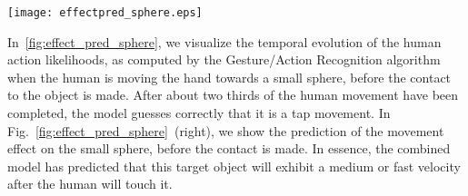 
\begin{figure*}
  \quad
  \texttt{[image: effectpred\_sphere.eps]}
  \caption{Object velocity predictions on a small sphere, given probabilistic human action information from Gesture \acp{HMM}.}
  \label{fig:effect_pred_sphere}
\end{figure*}

In~\ref{fig:effect_pred_sphere}, we visualize the temporal evolution of the human action likelihoods, as computed by the Gesture/Action Recognition algorithm when the human is moving the hand towards a small sphere, before the contact to the object is made.
After about two thirds of the human movement have been completed, the model guesses correctly that it is a tap movement.
In Fig.~\ref{fig:effect_pred_sphere}~(right), we show the prediction of the movement effect on the small sphere, before the contact is made.
In essence, the combined model has predicted that this target object will exhibit a medium or fast velocity after the human will touch it.


